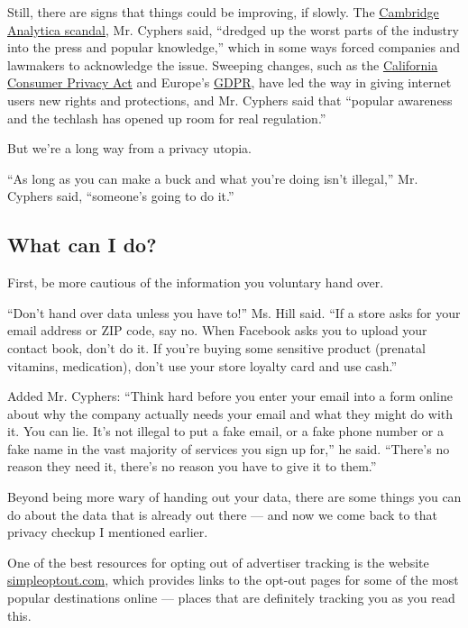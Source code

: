 Still, there are signs that things could be improving, if slowly. The
\href{https://www.nytimes.com/2018/04/04/us/politics/cambridge-analytica-scandal-fallout.html}{Cambridge
Analytica scandal}, Mr. Cyphers said, ``dredged up the worst parts of
the industry into the press and popular knowledge,'' which in some ways
forced companies and lawmakers to acknowledge the issue. Sweeping
changes, such as the
\href{https://www.nytimes.com/2018/06/28/technology/california-online-privacy-law.html?module=inline}{California
Consumer Privacy Act} and Europe's
\href{https://www.nytimes.com/2018/05/24/technology/europe-gdpr-privacy.html}{GDPR},
have led the way in giving internet users new rights and protections,
and Mr. Cyphers said that ``popular awareness and the techlash has
opened up room for real regulation.''

But we're a long way from a privacy utopia.

``As long as you can make a buck and what you're doing isn't illegal,''
Mr. Cyphers said, ``someone's going to do it.''

\hypertarget{what-can-i-do}{%
\subsection{What can I do?}\label{what-can-i-do}}

First, be more cautious of the information you voluntary hand over.

``Don't hand over data unless you have to!'' Ms. Hill said. ``If a store
asks for your email address or ZIP code, say no. When Facebook asks you
to upload your contact book, don't do it. If you're buying some
sensitive product (prenatal vitamins, medication), don't use your store
loyalty card and use cash.''

Added Mr. Cyphers: ``Think hard before you enter your email into a form
online about why the company actually needs your email and what they
might do with it. You can lie. It's not illegal to put a fake email, or
a fake phone number or a fake name in the vast majority of services you
sign up for,'' he said. ``There's no reason they need it, there's no
reason you have to give it to them.''

Beyond being more wary of handing out your data, there are some things
you can do about the data that is already out there --- and now we come
back to that privacy checkup I mentioned earlier.

One of the best resources for opting out of advertiser tracking is the
website \href{https://simpleoptout.com/}{simpleoptout.com}, which
provides links to the opt-out pages for some of the most popular
destinations online --- places that are definitely tracking you as you
read this.

